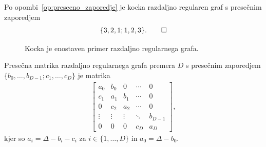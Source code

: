 \documentclass[fin1, tisk]{fmfdelo}
\begin{document}


\begin{zgled}
    Po opombi~\ref{op:presecno_zaporedje} je kocka razdaljno regularen graf s presečnim zaporedjem 
    \[\{3, 2, 1; 1, 2, 3\}.\qedhere\]
\end{zgled}
\begin{figure}[ht]
    \centering
    \def\svgwidth{\columnwidth}
    \caption{Kocka je enostaven primer razdaljno regularnega grafa.}
    \label{fig:kocka}
\end{figure}

\begin{definicija}
    Presečna matrika razdaljno regularnega grafa premera $D$ s presečnim zaporedjem $\{b_0, \ldots, b_{D-1}; c_1, \ldots, c_D\}$ 
    je matrika
    \begin{align*}
        \begin{bmatrix}
            a_0 & b_0 & 0 & \cdots & 0 \\
            c_1 & a_1 & b_1 & \cdots & 0 \\
            0 & c_2 & a_2 & \cdots & 0 \\
            \vdots & \vdots & \vdots & \ddots & b_{D-1} \\
            0 & 0 & 0 & c_D & a_D
        \end{bmatrix},
    \end{align*}
    kjer so $a_i = \Delta - b_i - c_i$ za $i \in \{1, \ldots, D\}$ in $a_0 = \Delta - b_0$.
\end{definicija}
\end{document}
